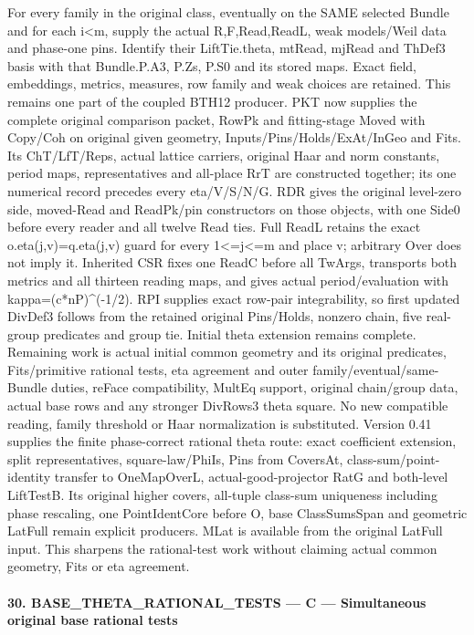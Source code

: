 For every family in the original class, eventually on the SAME selected Bundle and for each i<m, supply the actual R,F,Read,ReadL, weak models/Weil data and phase-one pins. Identify their LiftTie.theta, mtRead, mjRead and ThDef3 basis with that Bundle.P.A3, P.Zs, P.S0 and its stored maps. Exact field, embeddings, metrics, measures, row family and weak choices are retained. This remains one part of the coupled BTH12 producer. PKT now supplies the complete original comparison packet, RowPk and fitting-stage Moved with Copy/Coh on original given geometry, Inputs/Pins/Holds/ExAt/InGeo and Fits. Its ChT/LfT/Reps, actual lattice carriers, original Haar and norm constants, period maps, representatives and all-place RrT are constructed together; its one numerical record precedes every eta/V/S/N/G. RDR gives the original level-zero side, moved-Read and ReadPk/pin constructors on those objects, with one Side0 before every reader and all twelve Read ties. Full ReadL retains the exact o.eta(j,v)=q.eta(j,v) guard for every 1<=j<=m and place v; arbitrary Over does not imply it. Inherited CSR fixes one ReadC before all TwArgs, transports both metrics and all thirteen reading maps, and gives actual period/evaluation with kappa=(c*nP)\textasciicircum{}(-1/2). RPI supplies exact row-pair integrability, so first updated DivDef3 follows from the retained original Pins/Holds, nonzero chain, five real-group predicates and group tie. Initial theta extension remains complete. Remaining work is actual initial common geometry and its original predicates, Fits/primitive rational tests, eta agreement and outer family/eventual/same-Bundle duties, reFace compatibility, MultEq support, original chain/group data, actual base rows and any stronger DivRows3 theta square. No new compatible reading, family threshold or Haar normalization is substituted. Version 0.41 supplies the finite phase-correct rational theta route: exact coefficient extension, split representatives, square-law/PhiIs, Pins from CoversAt, class-sum/point-identity transfer to OneMapOverL, actual-good-projector RatG and both-level LiftTestB. Its original higher covers, all-tuple class-sum uniqueness including phase rescaling, one PointIdentCore before O, base ClassSumsSpan and geometric LatFull remain explicit producers. MLat is available from the original LatFull input. This sharpens the rational-test work without claiming actual common geometry, Fits or eta agreement.



\paragraph{30. BASE\_\allowbreak THETA\_\allowbreak RATIONAL\_\allowbreak TESTS — C — Simultaneous original base rational tests}

